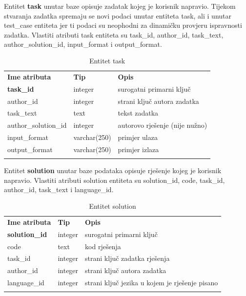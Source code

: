 \documentclass[times, utf8, zavrsni, numeric]{fer}
\begin{document}
		Entitet \textbf{task} unutar baze opisuje zadatak kojeg je korisnik napravio. Tijekom stvaranja zadatka spremaju se novi podaci unutar entiteta task, ali i unutar test\_case entiteta jer ti podaci su neophodni za dinamičku provjeru ispravnosti zadatka. Vlastiti atributi task entiteta su task\_id, author\_id, task\_text, author\_solution\_id, input\_format i output\_format.
		\begin{table}[H]
			\caption{Entitet task}
			\label{tbl:task}
			\centering
			\begin{tabu} to \textwidth {XXX}
				\tabucline[1.75pt]{-}
				\textbf{Ime atributa} & \textbf{Tip} & \textbf{Opis}\\ 				
				\tabucline[1.75pt]{-}
				\textbf{task\_id} & integer & surogatni primarni ključ\\ \hline
				author\_id & integer & strani ključ autora zadatka\\ \hline
				task\_text & text & tekst zadatka\\ \hline
				author\_solution\_id & integer & autorovo rješenje (nije nužno)\\ \hline
				input\_format & varchar(250) & primjer ulaza\\ \hline
				output\_format & varchar(250) & primjer izlaza\\ \hline
				\tabucline[1.75pt]{-}
			\end{tabu}
		\end{table}
	

		Entitet \textbf{solution} unutar baze podataka opisuje rješenje  kojeg je korisnik napravio. Vlastiti atributi solution entiteta su solution\_id, code, task\_id, author\_id, task\_text i language\_id.
		\begin{table}[H]
			\caption{Entitet solution}
			\label{tbl:solution}
			\centering
			\begin{tabu} to \textwidth {XXX}
				\tabucline[1.75pt]{-}
				\textbf{Ime atributa} & \textbf{Tip} & \textbf{Opis}\\ 				
				\tabucline[1.75pt]{-}
				\textbf{solution\_id} & integer & surogatni primarni ključ\\ \hline
				code & text & kod rješenja\\ \hline
				task\_id & integer & strani ključ zadatka rješenja\\ \hline
				author\_id & integer & strani ključ autora zadatka\\ \hline
				language\_id & integer & strani ključ jezika u kojem je rješenje pisano\\ \hline
				\tabucline[1.75pt]{-}
			\end{tabu}
		\end{table}
	
\end{document}
